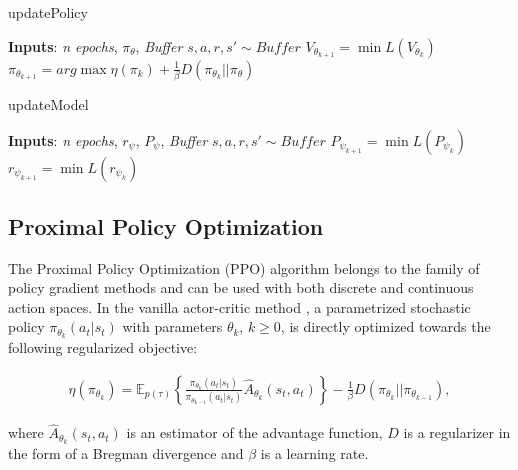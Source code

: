 \documentclass{article}
\begin{document}
    
\begin{algorithm}[t]
	\caption{updatePolicy}
	\begin{algorithmic}[1]
		\STATE \textbf{Inputs}: \textit{n epochs}, $\pi_\theta$, \textit{Buffer} 
				\STATE  $s,a,r,s' \sim \textit{Buffer}$
			    \STATE  $V_{\theta_ {k+1}} = \min L(V_{\theta_k})$
			    \STATE  $\pi_{\theta_{k+1}} =  arg\max \eta (\pi_k)  + \frac{1}{\beta} D(\pi_{\theta_k} \rvert \rvert \pi_{\theta})$
			\ENDFOR
	\end{algorithmic}
	\label{update_policy}
\end{algorithm}

\begin{algorithm}[t]
	\caption{updateModel}
	\begin{algorithmic}[1]
		\STATE \textbf{Inputs}: \textit{n epochs}, $r_\psi$, $P_\psi$, \textit{Buffer} 
				\STATE  $s,a,r,s' \sim \textit{Buffer}$
			    \STATE  $P_{\psi_{k+1}} = \min L(P_{\psi_k})$
			    \STATE  $r_{\psi_{k+1}} = \min L(r_{\psi_k})$
			\ENDFOR
	\end{algorithmic}
	\label{update_model}
\end{algorithm}


\subsection{ Proximal Policy Optimization}
    
    The Proximal Policy Optimization (PPO) algorithm \cite{Schulman2017} belongs to the family of policy gradient methods and can be used with both discrete and continuous action spaces. In the vanilla actor-critic method \cite{sutton2000policy}, a parametrized stochastic policy $\pi_{\theta_k}(a_t|s_t)$ with parameters $\theta_k$, $k\geq 0$, is directly optimized towards the following regularized objective:
    
    \begin{gather}
        \eta(\pi_{\theta_k})  = \mathbb{E}_{p(\tau)}\left\lbrace 
        \frac{\pi_{\theta_k}(a_t \rvert s_t)}{\pi_{\theta_{k-1}}(a_t \rvert s_t  )} \hat{A}_{\theta_k}(s_t,a_t)\right\rbrace  - \frac{1}{\beta}  
        D( \pi_{\theta_k} \rvert \rvert \pi_{\theta_{k-1}}) ,\label{eqn: regularized}
    \end{gather}

	\noindent
	where $\hat{A}_{\theta_k}(s_t,a_t)$ is an estimator of the advantage function, $D$ is a regularizer in the form of a Bregman divergence and $\beta$ is a learning rate.
    
\end{document}
